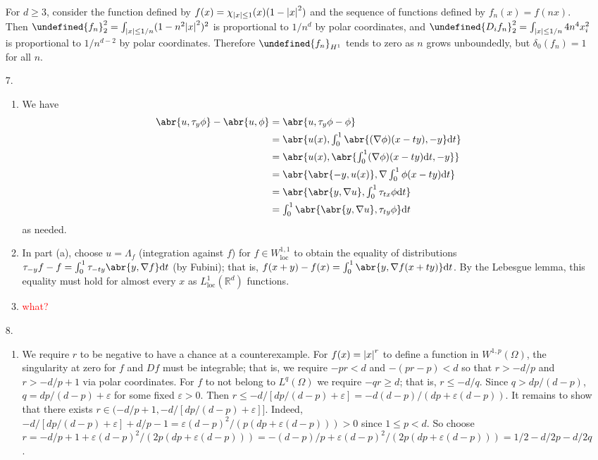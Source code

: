 \documentclass[11pt,leqno]{article}
\theoremstyle{plain}
\theoremstyle{definition}
\numberwithin{equation}{section}
\numberwithin{lem}{section}
\let\norm\undefined %
\DeclarePairedDelimiter\norm{\lVert}{\rVert}
\begin{document}
\begin{enumerate}
    For $d\geq 3$, consider the function defined by $f(x) = \chi_{\abs{x}\leq 1}(x)(1-\abs{x}^2)$ and the sequence of functions defined by $f_n(x) = f(nx)$. Then $\norm{f_n}_2^2 = \int_{\abs{x}\leq 1/n}(1-n^2\abs{x}^2)^2$ is proportional to $1/n^d$ by polar coordinates, and $\norm{D_if_n}_2^2 = \int_{\abs{x}\leq 1/n}4n^4x_i^2$ is proportional to $1/n^{d-2}$ by polar coordinates. Therefore $\norm{f_n}_{H^1}$ tends to zero as $n$ grows unboundedly, but $\delta_0(f_n) = 1$ for all $n$.
    \item[7.] \begin{enumerate}
      \item We have \begin{align*}
        \abr{u,\tau_y\phi} - \abr{u,\phi} &= \abr{u,\tau_y\phi - \phi} \\
        &= \abr{u(x),\textstyle\int_0^1\abr{(\nabla\phi)(x-ty),-y}\dd t}\\
        &= \abr{u(x),\abr{\textstyle\int_0^1(\nabla\phi)(x-ty)\dd t,-y}}\\
        &= \abr{\abr{-y,u(x)},\nabla\textstyle\int_0^1\phi(x-ty)\dd t}\\
        &= \abr{\abr{y,\nabla u},\textstyle\int_0^1\tau_{tx}\phi\dd t}\\
        &= \textstyle\int_0^1\abr{\abr{y,\nabla u},\tau_{ty}\phi}\dd t
      \end{align*} as needed.
      \item In part (a), choose $u = \Lambda_f$ (integration against $f$) for $f\in W^{1,1}_{\mathrm{loc}}$ to obtain the equality of distributions $\tau_{-y}f-f = \int_0^1\tau_{-ty}\abr{y,\nabla f}\dd t$ (by Fubini); that is, $f(x+y)-f(x) = \int_0^1 \abr{y,\nabla f(x+ty)}\dd t$. By the Lebesgue lemma, this equality must hold for almost every $x$ as $L^1_{\mathrm{loc}}(\mathbb R^d)$ functions.
      \item \textcolor{red}{what?}
    \end{enumerate}
    \item[8.] \begin{enumerate}
      \item We require $r$ to be negative to have a chance at a counterexample. For $f(x) = \abs{x}^{r}$ to define a function in $W^{1,p}(\Omega)$, the singularity at zero for $f$ and $Df$ must be integrable; that is, we require $-pr<d$ and $-(pr-p)<d$ so that $r>-d/p$ and $r>-d/p+1$ via polar coordinates. For $f$ to not belong to $L^q(\Omega)$ we require $-qr\geq d$; that is, $r\leq -d/q$. Since $q > dp/(d-p)$, $q = dp/(d-p) + \varepsilon$ for some fixed $\varepsilon>0$. Then $r\leq -d/[dp/(d-p) + \varepsilon]= -d(d-p)/(dp+\varepsilon(d-p))$. It remains to show that there exists $r\in (-d/p+1, -d/[dp/(d-p) + \varepsilon]]$. Indeed, $-d/[dp/(d-p) + \varepsilon] + d/p-1 = \varepsilon(d-p)^2/(p(dp+\varepsilon(d-p)))>0$ since $1\leq p< d$. So choose $r = -d/p+1 + \varepsilon(d-p)^2/(2p(dp+\varepsilon(d-p))) = -(d-p)/p + \varepsilon(d-p)^2/(2p(dp+\varepsilon(d-p))) = 1/2-d/2p-d/2q$.

\end{enumerate}
\end{enumerate}
\end{document}
